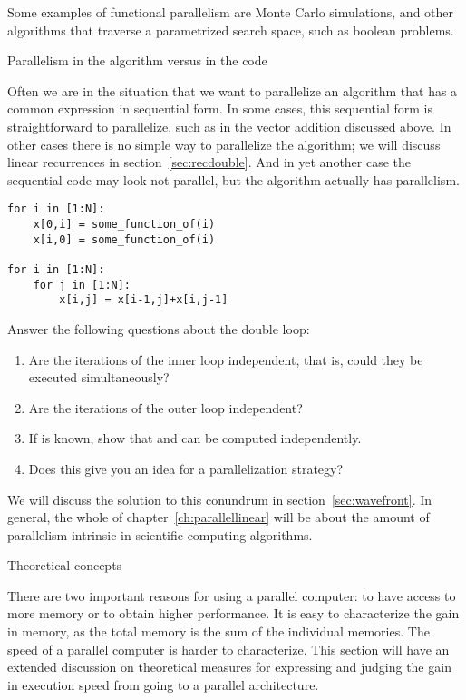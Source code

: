 Some examples of functional parallelism are Monte Carlo simulations,
and other algorithms that traverse a parametrized search space,
such as boolean  problems.

 {Parallelism in the algorithm versus in the code}

Often we are in the situation that we want to parallelize an algorithm
that has a common expression in sequential form.
In some cases, this
sequential form is straightforward to parallelize, such as in the vector
addition discussed above. In other cases there is no simple way to
parallelize the algorithm; we will discuss linear recurrences in
section~\ref{sec:recdouble}. And in yet another case the sequential code may
look not parallel, but the algorithm actually has parallelism.

\begin{exercise}
\begin{verbatim}
for i in [1:N]:
    x[0,i] = some_function_of(i)
    x[i,0] = some_function_of(i)

for i in [1:N]:
    for j in [1:N]:
        x[i,j] = x[i-1,j]+x[i,j-1]
\end{verbatim}

Answer the following questions about the double  loop:
\begin{enumerate}
\item Are the iterations of the inner loop independent, that is, could
  they be executed simultaneously?
\item Are the iterations of the outer loop independent?
\item If  is known, show that  and  can
  be computed independently.
\item Does this give you an idea for a parallelization strategy?
\end{enumerate}
\end{exercise}

We will discuss the solution to this conundrum in
section~\ref{sec:wavefront}. In general, the whole of
chapter~\ref{ch:parallellinear} will be about the amount of
parallelism intrinsic in scientific computing algorithms.

 {Theoretical concepts}
\label{sec:speedup-efficiency}

There are two important reasons for using a parallel computer: to have
access to more memory or to obtain higher performance. It is easy to
characterize the gain in memory, as the total memory is the sum of the
individual memories. The speed of a parallel computer is harder to
characterize. This section will have an extended discussion on
theoretical measures for expressing and judging the gain in execution
speed from going to a parallel architecture.

